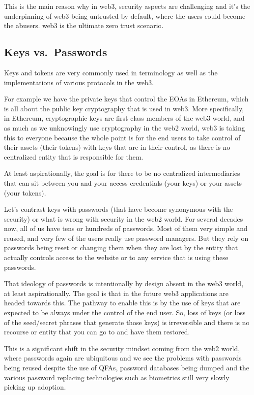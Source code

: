 This is the main reason why in web3, security aspects are challenging
and it's the underpinning of web3 being untrusted by default, where the
users could become the abusers. web3 is the ultimate zero trust
scenario.

\subsection{Keys vs.~Passwords}\label{keys-vs.-passwords}

Keys and tokens are very commonly used in terminology as well as the
implementations of various protocols in the web3.

For example we have the private keys that control the EOAs in Ethereum,
which is all about the public key cryptography that is used in web3.
More specifically, in Ethereum, cryptographic keys are first class
members of the web3 world, and as much as we unknowingly use
cryptography in the web2 world, web3 is taking this to everyone because
the whole point is for the end users to take control of their assets
(their tokens) with keys that are in their control, as there is no
centralized entity that is responsible for them.

At least aspirationally, the goal is for there to be no centralized
intermediaries that can sit between you and your access credentials
(your keys) or your assets (your tokens).

Let's contrast keys with passwords (that have become synonymous with the
security) or what is wrong with security in the web2 world. For several
decades now, all of us have tens or hundreds of passwords. Most of them
very simple and reused, and very few of the users really use password
managers. But they rely on passwords being reset or changing them when
they are lost by the entity that actually controls access to the website
or to any service that is using these passwords.

That ideology of passwords is intentionally by design absent in the web3
world, at least aspirationally. The goal is that in the future web3
applications are headed towards this. The pathway to enable this is by
the use of keys that are expected to be always under the control of the
end user. So, loss of keys (or loss of the seed/secret phrases that
generate those keys) is irreversible and there is no recourse or entity
that you can go to and have them restored.

This is a significant shift in the security mindset coming from the web2
world, where passwords again are ubiquitous and we see the problems with
passwords being reused despite the use of QFAs, password databases being
dumped and the various password replacing technologies such as
biometrics still very slowly picking up adoption.

